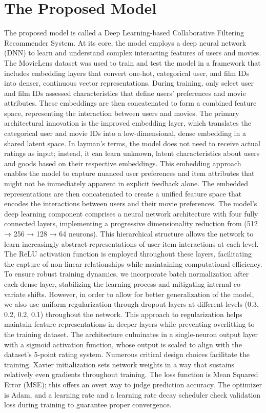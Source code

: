 \documentclass[sigconf]{acmart}
\begin{document}
\section{The Proposed Model}\label{sec:framework}
The proposed model is called a Deep Learning-based Collaborative Filtering Recommender System. At its core, the model employs a deep neural network (DNN) to learn and understand complex interacting features of users and movies. The MovieLens dataset was used to train and test the model in a framework that includes embedding layers that convert one-hot, categorical user, and film IDs into denser, continuous vector representations. During training, only select user and film IDs assessed characteristics that define users' preferences and movie attributes. These embeddings are then concatenated to form a combined feature space, representing the interaction between users and movies. 
The primary architectural innovation is the improved embedding layer, which translates the categorical user and movie IDs into a low-dimensional, dense embedding in a shared latent space. In layman's terms, the model does not need to receive actual ratings as input; instead, it can learn unknown, latent characteristics about users and goods based on their respective embeddings. This embedding approach enables the model to capture nuanced user preferences and item attributes that might not be immediately apparent in explicit feedback alone. The embedded representations are then concatenated to create a unified feature space that encodes the interactions between users and their movie preferences.
The model's deep learning component comprises a neural network architecture with four fully connected layers, implementing a progressive dimensionality reduction from (512 → 256 → 128 → 64 neurons). This hierarchical structure allows the network to learn increasingly abstract representations of user-item interactions at each level. The ReLU activation function is employed throughout these layers, facilitating the capture of non-linear relationships while maintaining computational efficiency. To ensure robust training dynamics, we incorporate batch normalization after each dense layer, stabilizing the learning process and mitigating internal co-variate shifts. However, in order to allow for better generalization of the model, we also use uniform regularization through dropout layers at different levels (0.3, 0.2, 0.2, 0.1) throughout the network. This approach to regularization helps maintain feature representations in deeper layers while preventing overfitting to the training dataset. The architecture culminates in a single-neuron output layer with a sigmoid activation function, whose output is scaled to align with the dataset's 5-point rating system.
Numerous critical design choices facilitate the training. Xavier initialization sets network weights in a way that sustains relatively even gradients throughout training. The loss function is Mean Squared Error (MSE); this offers an overt way to judge prediction accuracy. The optimizer is Adam, and a learning rate and a learning rate decay scheduler check validation loss during training to guarantee proper convergence.
\end{document}
